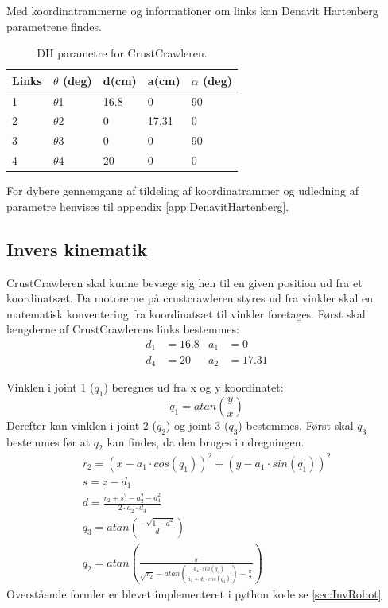 
Med koordinatrammerne og informationer om links kan Denavit Hartenberg parametrene findes. 

\begin{table}[H]
\centering
\begin{tabular}{l|l|l|l|l}
Links	&	$\theta$ (deg) 	&	d(cm)		&	a(cm)		& 	$\alpha$ (deg)\\
\hline
1		&	$\theta$1			&	16.8			&	0			&	90\\
2		&	$\theta$2			&	0			&	17.31		&	0\\
3		&	$\theta$3			&	0			&	0			&	90\\
4		&	$\theta$4			&	20		&	0			&	0\\
\end{tabular}	
\caption{DH parametre for CrustCrawleren.}
\end{table}

For dybere gennemgang af tildeling af koordinatrammer og udledning af parametre henvises til appendix \vref{app:DenavitHartenberg}.

\subsection{Invers kinematik}
CrustCrawleren skal kunne bevæge sig hen til en given position ud fra et koordinatsæt. Da motorerne på crustcrawleren styres ud fra vinkler skal en matematisk konventering fra koordinatsæt til vinkler foretages.\newline
Først skal længderne af CrustCrawlerens links bestemmes:
\begin{align}
	d_1&=16.8	&	a_1&=0\\
	d_4&=20		&	a_2&=17.31
\end{align}

Vinklen i joint 1 ($q_1$) beregnes ud fra x og y koordinatet:
\begin{equation}
	q_1=atan\left(\frac{y}{x}\right)
\end{equation}
Derefter kan vinklen i joint 2 ($q_2$) og joint 3 ($q_3$) bestemmes.
Først skal $q_3$ bestemmes før at $q_2$ kan findes, da den bruges i udregningen.
\begin{gather}
	r_2=\left(x-a_1\cdot cos(q_1)\right)^2+\left(y-a_1\cdot sin(q_1)\right)^2\\
	s=z-d_1\\
	d=\frac{r_2+s^2-a_2^2-d_4^2}{2\cdot a_2\cdot d_4}\\
	q_3=atan\left(\frac{-\sqrt{1-d^2}}{d}\right)\\
	q_2=atan\left(\frac{s}{\sqrt{r_2}-atan\left(\frac{d_4\cdot sin(q_3)}{a_2+d_4\cdot cos(q_3)}\right)-\frac{\pi}{2}}\right)
\end{gather}
Overstående formler er blevet implementeret i python kode se \vref{sec:InvRobot}

